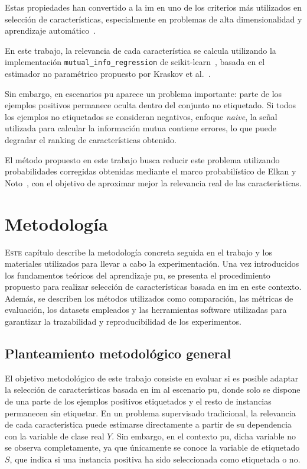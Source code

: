 Estas propiedades han convertido a la \acrshort{im} en uno de los criterios más utilizados en selección de características, especialmente en problemas de alta dimensionalidad y aprendizaje automático~\cite{guyon2003introduction, saeys2007review}.

En este trabajo, la relevancia de cada característica se calcula utilizando la implementación \texttt{mutual\_info\_regression} de scikit-learn~\cite{pedregosa2011sklearn}, basada en el estimador no paramétrico propuesto por Kraskov et al.~\cite{kraskov2004estimating}.

Sin embargo, en escenarios \acrshort{pu} aparece un problema importante: parte de los ejemplos positivos permanece oculta dentro del conjunto no etiquetado. Si todos los ejemplos no etiquetados se consideran negativos, enfoque \textit{naive}, la señal utilizada para calcular la información mutua contiene errores, lo que puede degradar el ranking de características obtenido.

El método propuesto en este trabajo busca reducir este problema utilizando probabilidades corregidas obtenidas mediante el marco probabilístico de Elkan y Noto~\cite{elkan2008learning}, con el objetivo de aproximar mejor la relevancia real de las características.

\chapter{Metodología}
\label{chap:metodologia_materiales}

\lettrine{E}{ste} capítulo describe la metodología concreta seguida en el trabajo y los materiales utilizados para llevar a cabo la experimentación. Una vez introducidos los fundamentos teóricos del aprendizaje \acrshort{pu}, se presenta el procedimiento propuesto para realizar selección de características basada en \acrshort{im} en este contexto. Además, se describen los métodos utilizados como comparación, las métricas de evaluación, los datasets empleados y las herramientas software utilizadas para garantizar la trazabilidad y reproducibilidad de los experimentos.

\section{Planteamiento metodológico general}
\label{sec:planteamiento_metodologico}

El objetivo metodológico de este trabajo consiste en evaluar si es posible adaptar la selección de características basada en \acrshort{im} al escenario \acrshort{pu}, donde solo se dispone de una parte de los ejemplos positivos etiquetados y el resto de instancias permanecen sin etiquetar. En un problema supervisado tradicional, la relevancia de cada característica puede estimarse directamente a partir de su dependencia con la variable de clase real $Y$. Sin embargo, en el contexto \acrshort{pu}, dicha variable no se observa completamente, ya que únicamente se conoce la variable de etiquetado $S$, que indica si una instancia positiva ha sido seleccionada como etiquetada o no.

